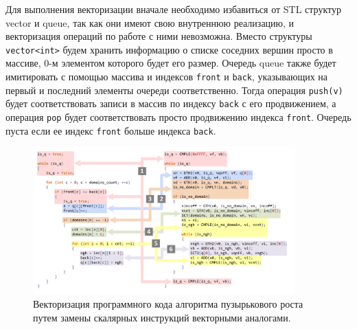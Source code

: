 Для выполнения векторизации вначале необходимо избавиться от STL\label{abbr:stl-1} структур vector и queue, так как они имеют свою внутреннюю реализацию, и векторизация операций по работе с ними невозможна.
Вместо структуры \texttt{vector<int>} будем хранить информацию о списке соседних вершин просто в массиве, 0-м элементом которого будет его размер.
Очередь queue также будет имитировать с помощью массива и индексов \texttt{front} и \texttt{back}, указывающих на первый и последний элементы очереди соответственно.
Тогда операция \texttt{push(v)} будет соответствовать записи в массив по индексу \texttt{back} с его продвижением, а операция \texttt{pop} будет соответствовать просто продвижению индекса \texttt{front}.
Очередь пуста если ее индекс \texttt{front} больше индекса \texttt{back}.

\begin{figure}[ht]
\centering
\includegraphics[width=0.90\textwidth]{fig/vec_genetic_code.pdf}
\singlespacing
{}\caption{Векторизация программного кода алгоритма пузырькового роста путем замены скалярных инструкций векторными аналогами.}
\label{fig:text_4_vec_integer_code}
\end{figure}

